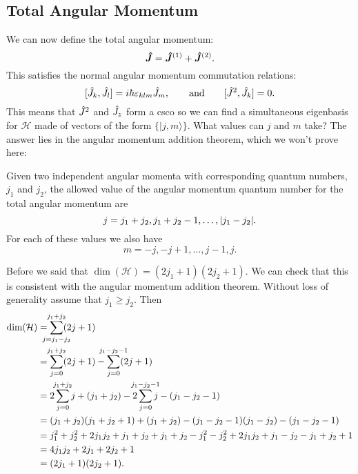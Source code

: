 \documentclass[a4paper]{article}
\renewcommand{\ket}[1]{\vert {#1} \rangle}
\newcommand{\hilbert}{\mathcal{H}}
\newcommand{\vecoperator}[1]{\vv{\operator{#1}}}
\theoremstyle{definition}
\begin{document}
    \subsection{Total Angular Momentum}\label{sec:total angular momentum}
    We can now define the total angular momentum:
    \[\vecoperator{J} = \vecoperator{J}^{(1)} + \vecoperator{J}^{(2)}.\]
    This satisfies the normal angular momentum commutation relations:
    \[[\hat{J}_k, \hat{J}_l] = i\hbar\varepsilon_{klm}\hat{J}_m, \qquad\text{and}\qquad [\hat{J}^2, \hat{J}_k] = 0.\]
    This means that \(\hat{J}^2\) and \(\hat{J}_z\) form a \gls{csco} so we can find a simultaneous eigenbasis for \(\hilbert\) made of vectors of the form \(\{\ket{j, m}\}\).
    What values can \(j\) and \(m\) take?
    The answer lies in the angular momentum addition theorem, which we won't prove here:
    \begin{theorem}
        Given two independent angular momenta with corresponding quantum numbers, \(j_1\) and \(j_2\), the allowed value of the angular momentum quantum number for the total angular momentum are
        \[j = j_1 + j_2, j_1 + j_2 - 1, \dotsc, \abs{j_1 - j_2}.\]
        For each of these values we also have
        \[m = -j, -j + 1, \dotsc, j - 1, j.\]
    \end{theorem}
    Before we said that \(\dim(\hilbert) = (2j_1 + 1)(2j_2 + 1)\).
    We can check that this is consistent with the angular momentum addition theorem.
    Without loss of generality assume that \(j_1 \ge j_2\).
    Then
    \begin{align*}
        \dim(\hilbert) &= \sum_{\mathclap{j=j_1 - j_2}}^{\mathclap{j_1 + j_2}} (2j + 1)\\
        &= \sum_{j=0}^{\mathclap{j_1 + j_2}} (2j + 1) - \sum_{j = 0}^{\mathclap{j_1 - j_2 - 1}} (2j + 1)\\
        &= 2\sum_{j=0}^{\mathclap{j_1 + j_2}} j + (j_1 + j_2) - 2\sum_{j = 0}^{\mathclap{j_1 - j_2 - 1}} j - (j_1 - j_2 - 1 )\\
        &= (j_1 + j_2)(j_1 + j_2 + 1) + (j_1 + j_2) - (j_1 - j_2 - 1)(j_1 - j_2) - (j_1 - j_2 - 1)\\
        &= j_1^2 + j_2^2 + 2j_1j_2 + j_1 + j_2 + j_1 + j_2 - j_1^2 - j_2^2 + 2j_1j_2 + j_1 - j_2 - j_1 + j_2 + 1\\
        &= 4j_1j_2 + 2j_1 + 2j_2 + 1\\
        &= (2j_1 + 1)(2j_2 + 1).\\
    \end{align*}
\end{document}
